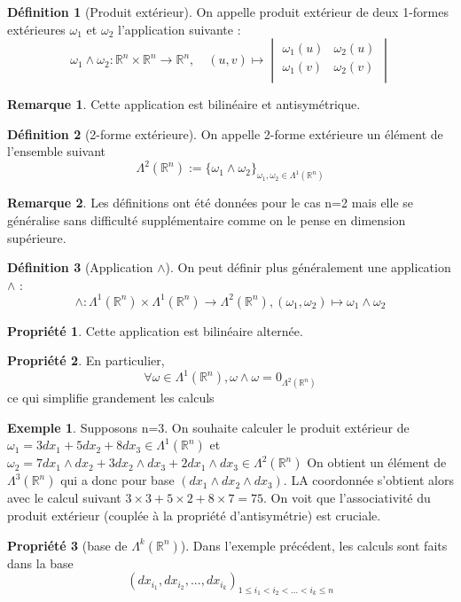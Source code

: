 \documentclass{article}
\newcommand{\R}{\mathbb{R}} %
\theoremstyle{definition} %
\newtheorem{defi}{Définition}
\newtheorem{rmq}{Remarque}
\newtheorem{ex}{Exemple}
\newtheorem{propri}{Propriété}
\newcommand{\lam}[1]{\Lambda^{#1} (\R^n)}
\newcommand{\1}{\mathbb{1}} %
\begin{document}
\begin{defi}[Produit extérieur]
On appelle produit extérieur de deux 1-formes extérieures $\omega_1$ et $\omega_2$ l'application suivante :
$$\omega_1 \wedge \omega_2 : \R^n \times \R^n \to \R^n, \quad (u,v) \mapsto \begin{vmatrix}
    \omega_1(u) & \omega_2(u) \\
    \omega_1(v) & \omega_2(v) \\
\end{vmatrix}  $$
\end{defi}
\begin{rmq}
Cette application est bilinéaire et antisymétrique.
\end{rmq}
\begin{defi}[2-forme extérieure]
On appelle 2-forme extérieure un élément de l'ensemble suivant
$$\Lambda^2 (\R^n) := \{\omega_1 \wedge \omega_2\}_{\omega_1,\omega_2 \in \Lambda^1 (\R^n)}$$
\end{defi}
\begin{rmq}
Les définitions ont été données pour le cas n=2 mais elle se généralise sans difficulté supplémentaire comme on le pense en dimension supérieure.
\end{rmq}

\begin{defi}[Application $\wedge$]
On peut définir plus généralement une application $\wedge$ :
$$\wedge : \Lambda^1(\R^n) \times \Lambda^1(\R^n) \to \Lambda^2(\R^n) , (\omega_1,\omega_2) \mapsto \omega_1 \wedge \omega_2$$
\end{defi}
\begin{propri}
Cette application est bilinéaire alternée.
\end{propri}
\begin{propri}
En particulier,
$$\forall \omega \in \lam{1}, \omega \wedge \omega = 0_{\lam{2}}$$
ce qui simplifie grandement les calculs
\end{propri}
\begin{ex}
Supposons n=3.
On souhaite calculer le produit extérieur de $\omega_1=3dx_1+5dx_2+8dx_3 \in \lam{1}$ et $\omega_2=7dx_1 \wedge dx_2 +3dx_2 \wedge dx_3 +2dx_1 \wedge dx_3 \in \lam{2}$
On obtient un élément de $\lam{3}$ qui a donc pour base $(dx_1 \wedge dx_2 \wedge dx_3)$. LA coordonnée s'obtient alors avec le calcul suivant
$3 \times 3 + 5 \times 2 + 8 \times 7=75$.
On voit que l'associativité du produit extérieur (couplée à la propriété d'antisymétrie) est cruciale.
\end{ex}
\begin{propri}[base de $\lam{k}$]
Dans l'exemple précédent, les calculs sont faits dans la base
$$(dx_{i_1},dx_{i_2},...,dx_{i_k})_{1 \leq i_1 < i_2 < ... < i_k \leq n}$$
\end{propri}
\end{document}

